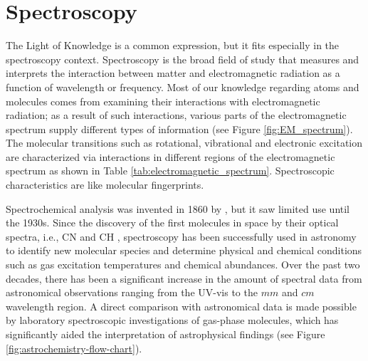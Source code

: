 \section{Spectroscopy}
\label{sec:spectroscopy}

The Light of Knowledge is a common expression, but it fits especially in the
spectroscopy context. Spectroscopy is the broad field of study that measures
and interprets the interaction between matter and electromagnetic radiation
as a function of wavelength or frequency. Most of our knowledge regarding atoms and molecules 
comes from examining their interactions with electromagnetic radiation; 
as a result of such interactions, various parts of the electromagnetic spectrum supply
different types of information (see Figure \ref{fig:EM_spectrum}). The
molecular transitions such as rotational, vibrational and electronic excitation
are characterized via interactions in different regions of the electromagnetic
spectrum as shown in Table \ref{tab:electromagnetic_spectrum}. Spectroscopic
characteristics are like molecular fingerprints.



Spectrochemical analysis was invented in 1860 by
\citet{kirchhoff_chemical_1860}, but it saw limited use until the 1930s. Since
the discovery of the first molecules in space by their optical spectra, i.e.,
CN and CH \cite{dunham_jr_interstellar_1937, adams_quoted_1937,
    mckellar_evidence_1940, mckellar_wave_1940}, spectroscopy has been successfully
used in astronomy to identify new molecular species and determine physical and
chemical conditions such as gas excitation temperatures and chemical
abundances. Over the past two decades, there has been a significant increase in
the amount of spectral data from astronomical observations ranging from the UV-vis to the $mm$ and $cm$
wavelength region. A direct comparison with astronomical data is made possible
by laboratory spectroscopic investigations of gas-phase molecules, which has
significantly aided the interpretation of astrophysical findings (see Figure
\ref{fig:astrochemistry-flow-chart}).

